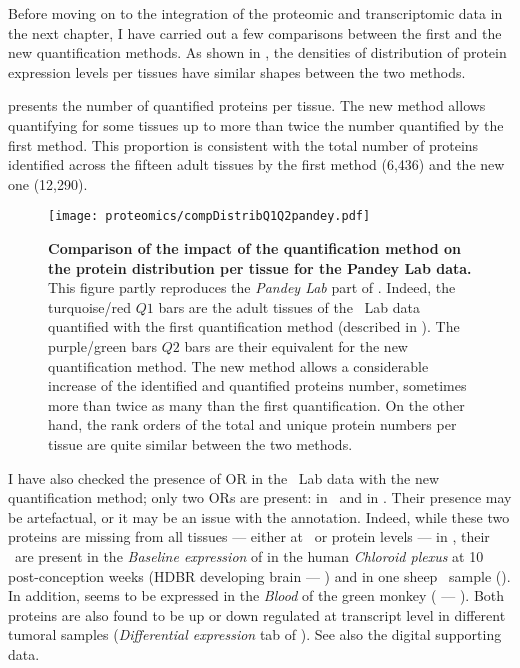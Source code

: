 Before moving on to the integration of the proteomic and transcriptomic data
in the next chapter,
I have carried out a few comparisons
between the first and the new quantification methods.
As shown in ,
the densities of distribution of protein expression levels per tissues
have similar shapes between the two methods.\mybr\

 presents the number of quantified proteins per tissue.
The new method allows quantifying for some tissues
up to more than twice the number quantified by the first method.
This proportion is consistent with the total number of proteins identified
across the fifteen adult tissues
by the first method (6,436)
and the new one (12,290).\mybr\

\begin{figure}[!ht]
    \texttt{[image: proteomics/compDistribQ1Q2pandey.pdf]}\centering
    \vspace{-3.5mm}
    \caption[Comparison of the impact of the quantification method on the
    protein distribution per tissue for Pandey Lab data]{\label{fig:pandeyQ1Q2comp}\textbf{Comparison of
    the impact of the quantification method on the protein distribution per tissue
    for the Pandey Lab data.}
    This figure partly reproduces the \emph{Pandey Lab} part
    of .
    Indeed, the turquoise/red $Q1$ bars are the adult tissues of the \pandey\ Lab data
    quantified with the first quantification method
    (described in ).
    The purple/green bars $Q2$ bars are their equivalent
    for the new quantification method.
    The new method allows a considerable increase of
    the identified and quantified proteins number,
    sometimes more than twice as many than the first quantification.
    On the other hand, the rank orders of the total and unique protein numbers per tissue
    are quite similar between the two methods.
    }
\end{figure}

I have also checked the presence of \gls{OR} in the \pandey\ Lab data
with the new quantification method;
only two \glspl{OR} are present:
 in \Kidney\ and  in \Liver.
Their presence may be artefactual, or it may be an issue with the annotation.
Indeed, while these two proteins are missing from all tissues
--- either at \RNA\ or protein levels
--- in ,
their \mRNAs\ are present
in the \emph{Baseline expression} of 
in the human \textit{Chloroid plexus} at 10 post-conception weeks
(HDBR developing brain --- )
and in one sheep \testis\ sample ().
In addition,  seems to be expressed in the \textit{Blood} of
the green monkey ( --- ).
Both proteins are also found to be up or down regulated at transcript level
in different tumoral samples (\emph{Differential expression} tab of \egxa).
See also the digital supporting data.\mybr\


